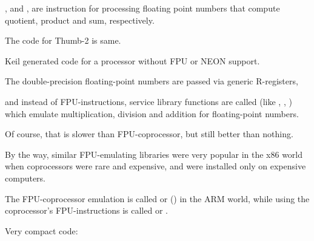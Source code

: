 ,  and , 
are instruction for processing floating point numbers that compute \gls{quotient}, 
\gls{product} and sum, respectively.

The code for Thumb-2 is same.




Keil generated code for a processor without FPU or NEON support.

The double-precision floating-point numbers are passed via generic R-registers,

and instead of FPU-instructions, service library functions are called
(like , , )
which emulate multiplication, division and addition for floating-point numbers.

Of course, that is slower than FPU-coprocessor, but still better than nothing.

By the way, similar FPU-emulating libraries were very popular in the x86 world when coprocessors were rare
and expensive, and were installed only on expensive computers.


The FPU-coprocessor emulation is called  or  () in the ARM world, 
while using the coprocessor's FPU-instructions is called  or .

\iffalse
\myindex{Raspberry Pi}

For example, the Linux kernel for Raspberry Pi is compiled in two variants.

In the \IT{soft float} case, arguments are passed via R-registers, and in the \IT{hard float} case---via D-registers.

And that is what stops you from using armhf-libraries from armel-code or vice versa,
and that is why all the code in Linux distributions must be compiled according to a single convention.
\fi


Very compact code:



